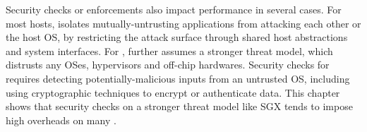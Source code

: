 Security checks or enforcements also
impact \thehostabi{} performance
in several cases.
For most hosts, %
\graphene{}
isolates
mutually-untrusting applications from attacking each other or the host OS, %
by restricting the attack surface through shared host abstractions and system interfaces.
For \sgx{},
\graphene{} further assumes a stronger threat model,
which distrusts any OSes, hypervisors and off-chip hardwares.
Security checks for \sgx{}
requires
detecting potentially-malicious inputs
from an untrusted OS,
including using cryptographic techniques
to encrypt or authenticate data.
This chapter shows that
security checks on a stronger threat model like SGX
tends to impose high overheads
on many \hostapis{}.

